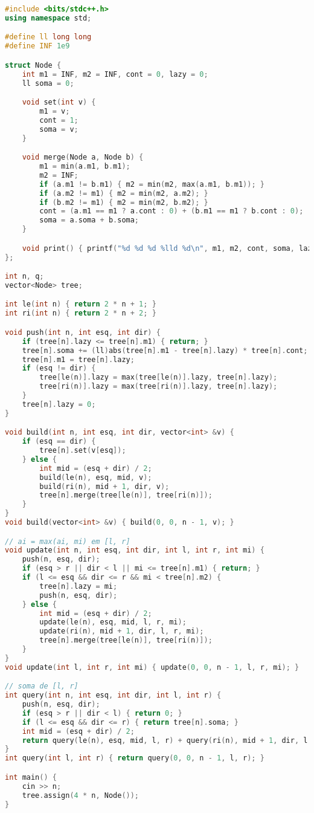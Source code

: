 \documentclass[11pt, a4paper, twoside]{book}
\begin{document}
\begin{lstlisting}[language=C++]
#include <bits/stdc++.h>
using namespace std;

#define ll long long
#define INF 1e9

struct Node {
    int m1 = INF, m2 = INF, cont = 0, lazy = 0;
    ll soma = 0;

    void set(int v) {
        m1 = v;
        cont = 1;
        soma = v;
    }

    void merge(Node a, Node b) {
        m1 = min(a.m1, b.m1);
        m2 = INF;
        if (a.m1 != b.m1) { m2 = min(m2, max(a.m1, b.m1)); }
        if (a.m2 != m1) { m2 = min(m2, a.m2); }
        if (b.m2 != m1) { m2 = min(m2, b.m2); }
        cont = (a.m1 == m1 ? a.cont : 0) + (b.m1 == m1 ? b.cont : 0);
        soma = a.soma + b.soma;
    }

    void print() { printf("%d %d %d %lld %d\n", m1, m2, cont, soma, lazy); }
};

int n, q;
vector<Node> tree;

int le(int n) { return 2 * n + 1; }
int ri(int n) { return 2 * n + 2; }

void push(int n, int esq, int dir) {
    if (tree[n].lazy <= tree[n].m1) { return; }
    tree[n].soma += (ll)abs(tree[n].m1 - tree[n].lazy) * tree[n].cont;
    tree[n].m1 = tree[n].lazy;
    if (esq != dir) {
        tree[le(n)].lazy = max(tree[le(n)].lazy, tree[n].lazy);
        tree[ri(n)].lazy = max(tree[ri(n)].lazy, tree[n].lazy);
    }
    tree[n].lazy = 0;
}

void build(int n, int esq, int dir, vector<int> &v) {
    if (esq == dir) {
        tree[n].set(v[esq]);
    } else {
        int mid = (esq + dir) / 2;
        build(le(n), esq, mid, v);
        build(ri(n), mid + 1, dir, v);
        tree[n].merge(tree[le(n)], tree[ri(n)]);
    }
}
void build(vector<int> &v) { build(0, 0, n - 1, v); }

// ai = max(ai, mi) em [l, r]
void update(int n, int esq, int dir, int l, int r, int mi) {
    push(n, esq, dir);
    if (esq > r || dir < l || mi <= tree[n].m1) { return; }
    if (l <= esq && dir <= r && mi < tree[n].m2) {
        tree[n].lazy = mi;
        push(n, esq, dir);
    } else {
        int mid = (esq + dir) / 2;
        update(le(n), esq, mid, l, r, mi);
        update(ri(n), mid + 1, dir, l, r, mi);
        tree[n].merge(tree[le(n)], tree[ri(n)]);
    }
}
void update(int l, int r, int mi) { update(0, 0, n - 1, l, r, mi); }

// soma de [l, r]
int query(int n, int esq, int dir, int l, int r) {
    push(n, esq, dir);
    if (esq > r || dir < l) { return 0; }
    if (l <= esq && dir <= r) { return tree[n].soma; }
    int mid = (esq + dir) / 2;
    return query(le(n), esq, mid, l, r) + query(ri(n), mid + 1, dir, l, r);
}
int query(int l, int r) { return query(0, 0, n - 1, l, r); }

int main() {
    cin >> n;
    tree.assign(4 * n, Node());
}
\end{lstlisting}
\end{document}
